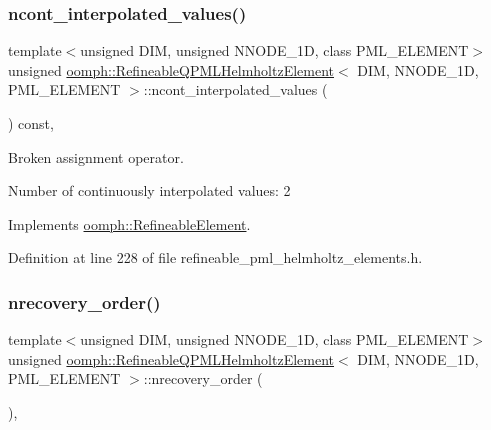 \subsubsection{\texorpdfstring{ncont\+\_\+interpolated\+\_\+values()}{ncont\_interpolated\_values()}}
{\footnotesize\ttfamily template$<$unsigned D\+IM, unsigned N\+N\+O\+D\+E\+\_\+1D, class P\+M\+L\+\_\+\+E\+L\+E\+M\+E\+NT$>$ \\
unsigned \hyperlink{classoomph_1_1RefineableQPMLHelmholtzElement}{oomph\+::\+Refineable\+Q\+P\+M\+L\+Helmholtz\+Element}$<$ D\+IM, N\+N\+O\+D\+E\+\_\+1D, P\+M\+L\+\_\+\+E\+L\+E\+M\+E\+NT $>$\+::ncont\+\_\+interpolated\+\_\+values (\begin{DoxyParamCaption}{ }\end{DoxyParamCaption}) const\hspace{0.3cm}{\ttfamily [inline]}, {\ttfamily [virtual]}}



Broken assignment operator. 

Number of continuously interpolated values\+: 2 

Implements \hyperlink{classoomph_1_1RefineableElement_a53e171a18c9f43f1db90a6876516a073}{oomph\+::\+Refineable\+Element}.



Definition at line 228 of file refineable\+\_\+pml\+\_\+helmholtz\+\_\+elements.\+h.

\mbox{\label{classoomph_1_1RefineableQPMLHelmholtzElement_ab60d67d814159aa25c5b0f980786d3f6}} 
\subsubsection{\texorpdfstring{nrecovery\+\_\+order()}{nrecovery\_order()}}
{\footnotesize\ttfamily template$<$unsigned D\+IM, unsigned N\+N\+O\+D\+E\+\_\+1D, class P\+M\+L\+\_\+\+E\+L\+E\+M\+E\+NT$>$ \\
unsigned \hyperlink{classoomph_1_1RefineableQPMLHelmholtzElement}{oomph\+::\+Refineable\+Q\+P\+M\+L\+Helmholtz\+Element}$<$ D\+IM, N\+N\+O\+D\+E\+\_\+1D, P\+M\+L\+\_\+\+E\+L\+E\+M\+E\+NT $>$\+::nrecovery\+\_\+order (\begin{DoxyParamCaption}{ }\end{DoxyParamCaption})\hspace{0.3cm}{\ttfamily [inline]}, {\ttfamily [virtual]}}



